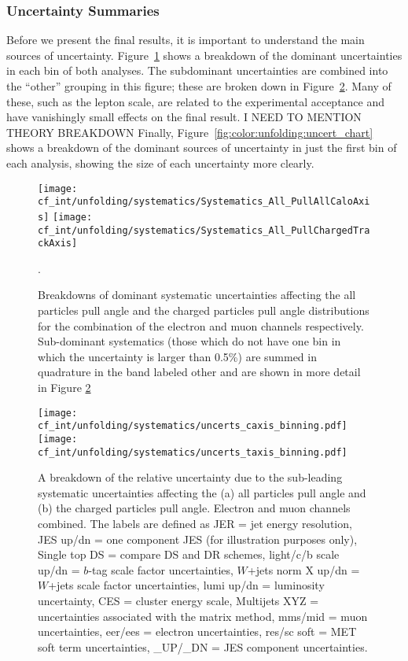 \subsubsection{Uncertainty Summaries}

	
	Before we present the final results, it is important to understand the main sources of uncertainty. Figure~\ref{fig:color:unfolding:systs_combined} shows a breakdown of the dominant uncertainties in each bin of both analyses. The subdominant uncertainties are combined into the ``other'' grouping in this figure; these are broken down in Figure~\ref{fig:color:unfolding:systs_small}. Many of these, such as the lepton scale, are related to the experimental acceptance and have vanishingly small effects on the final result. I NEED TO MENTION THEORY BREAKDOWN Finally, Figure~\ref{fig:color:unfolding:uncert_chart} shows a breakdown of the dominant sources of uncertainty in just the first bin of each analysis, showing the size of each uncertainty more clearly. 


\begin{figure}[htb]
  \texttt{[image: cf\_int/unfolding/systematics/Systematics\_All\_PullAllCaloAxis]}
  \texttt{[image: cf\_int/unfolding/systematics/Systematics\_All\_PullChargedTrackAxis]} \\
  \caption{Breakdowns of dominant systematic uncertainties affecting the all
    particles pull angle and the charged particles pull angle distributions for
    the combination of the electron and muon channels respectively. Sub-dominant systematics
    (those which do not have one bin in which the uncertainty is larger than
    0.5\%) are summed in quadrature in the band labeled other
    and are shown in more detail
    in Figure \ref{fig:color:unfolding:systs_small}}.
  \label{fig:color:unfolding:systs_combined}
\end{figure}



\begin{figure}[htb]
  \texttt{[image: cf\_int/unfolding/systematics/uncerts\_caxis\_binning.pdf]} \\
  \texttt{[image: cf\_int/unfolding/systematics/uncerts\_taxis\_binning.pdf]} \\
  \caption{A breakdown of the relative uncertainty due to the sub-leading systematic uncertainties affecting the (a) all particles pull angle and (b) the charged particles pull angle.  Electron and muon channels combined.  The labels are defined as JER = jet energy resolution, JES up/dn = one component JES (for illustration purposes only), Single top DS = compare DS and DR schemes, light/c/b scale up/dn = $b$-tag scale factor uncertainties, $W$+jets norm X up/dn = $W$+jets scale factor uncertainties, lumi up/dn = luminosity uncertainty, CES = cluster energy scale, Multijets XYZ = uncertainties associated with the matrix method, mms/mid = muon uncertainties, eer/ees = electron uncertainties, res/sc soft = MET soft term uncertainties, \_UP/\_DN = JES component uncertainties.}
  \label{fig:color:unfolding:systs_small}
\end{figure}



